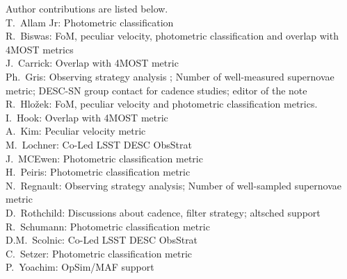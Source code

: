Author contributions are listed below. \\
T.~Allam Jr: Photometric classification \\
R.~Biswas: FoM, peculiar velocity, photometric classification and overlap with 4MOST metrics \\
J.~Carrick: Overlap with 4MOST metric \\
Ph.~Gris: Observing strategy analysis ; Number of well-measured supernovae metric; DESC-SN group contact for cadence studies; editor of the note \\
R.~Hlo\v{z}ek: FoM, peculiar velocity and photometric classification metrics. \\
I.~Hook: Overlap with 4MOST metric \\
A.~Kim: Peculiar velocity metric \\
M.~Lochner: Co-Led LSST DESC ObsStrat \\
J.~MCEwen: Photometric classification metric \\
H.~Peiris: Photometric classification metric \\
N.~Regnault: Observing strategy analysis; Number of well-sampled supernovae metric \\
D.~Rothchild: Discussions about cadence, filter strategy; altsched support \\
R.~Schumann: Photometric classification metric \\
D.M.~Scolnic: Co-Led LSST DESC ObsStrat \\
C.~Setzer: Photometric classification metric \\
P.~Yoachim: OpSim/MAF support \\
